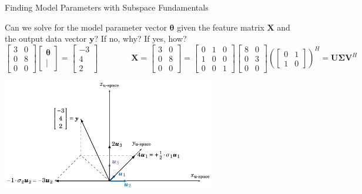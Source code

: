 \documentclass[mathserif, aspectratio=1610]{intbeamer}
\begin{document}
\begin{frame}[t]{Finding Model Parameters with Subspace Fundamentals}

Can we solve for the model parameter vector $\bm{\theta}$ given the feature matrix $\bm{X}$ and the output data vector $\bm{y}$?
%
If no, why? If yes, how?
$$
\begin{bmatrix}
3 & 0 \\ 0 & 8 \\ 0 & 0
\end{bmatrix}
\begin{bmatrix}
\bm{\theta} \\ |
\end{bmatrix}=
\begin{bmatrix}
-3 \\ 4 \\ 2
\end{bmatrix}
%
\qquad\qquad
\bm{X} =
\begin{bmatrix}
3 & 0 \\ 0 & 8 \\ 0 & 0
\end{bmatrix}
=
\begin{bmatrix}
0 & 1 & 0 \\
1 & 0 & 0 \\
0 & 0 & 1
\end{bmatrix}
%
\begin{bmatrix}
8 & 0\\
0 & 3\\
0 & 0
\end{bmatrix}
%
\left(
\begin{bmatrix}
0 & 1\\
1 & 0
\end{bmatrix}
\right)^H=
\bm{U} \bm{\Sigma} \bm{V}^H
$$

\begin{center}
\includegraphics[width=0.7\textwidth]{least_squares_error.pdf}
\end{center}


\end{frame}
\end{document}
